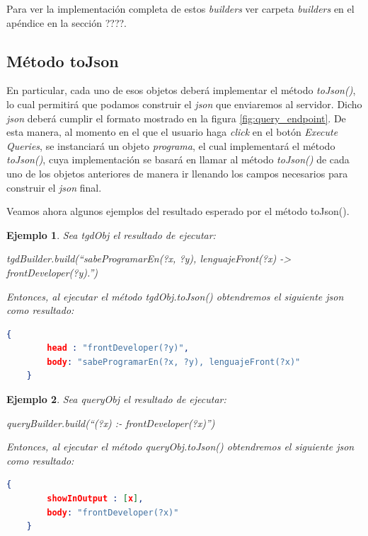 \documentclass[11pt,a4paper,twoside]{tesis}
\newtheorem{exmp}{Ejemplo}
\begin{document}
Para ver la implementación completa de estos \textit{builders} ver carpeta \textit{builders} en el apéndice en la sección ????.

\subsection{Método toJson}\label{metodo_tojson}

En particular, cada uno de esos objetos deberá implementar el método \textit{toJson()}, lo cual permitirá que podamos construir el \textit{json} que enviaremos al servidor. Dicho \textit{json} deberá cumplir el formato mostrado en la figura \ref{fig:query_endpoint}. De esta manera, al momento en el que el usuario haga \textit{click} en el botón \textit{Execute Queries}, se instanciará un objeto \textit{programa}, el cual implementará el método \textit{toJson()}, cuya implementación se basará en llamar al método \textit{toJson()} de cada uno de los objetos anteriores de manera ir llenando los campos necesarios para construir el \textit{json} final.

Veamos ahora algunos ejemplos del resultado esperado por el método toJson().

\begin{exmp}
Sea \textit{tgdObj} el resultado de ejecutar:

\begin{center}
   \textit{tgdBuilder.build(``sabeProgramarEn(?x, ?y), lenguajeFront(?x) ->  frontDeveloper(?y).'')} 
\end{center}

Entonces, al ejecutar el método \textit{tgdObj.toJson()} obtendremos el siguiente \textit{json} como resultado:


\begin{lstlisting}[language=json,firstnumber=1]
    {
        head : "frontDeveloper(?y)",
        body: "sabeProgramarEn(?x, ?y), lenguajeFront(?x)"
    }
\end{lstlisting}


\end{exmp}

\begin{exmp}
Sea \textit{queryObj} el resultado de ejecutar:

\begin{center}
   \textit{queryBuilder.build(``(?x) :- frontDeveloper(?x)'')} 
\end{center}

Entonces, al ejecutar el método \textit{queryObj.toJson()} obtendremos el siguiente \textit{json} como resultado:


\begin{lstlisting}[language=json,firstnumber=1]
    {
        showInOutput : [x],
        body: "frontDeveloper(?x)"
    }
\end{lstlisting}
\end{exmp}
\end{document}
